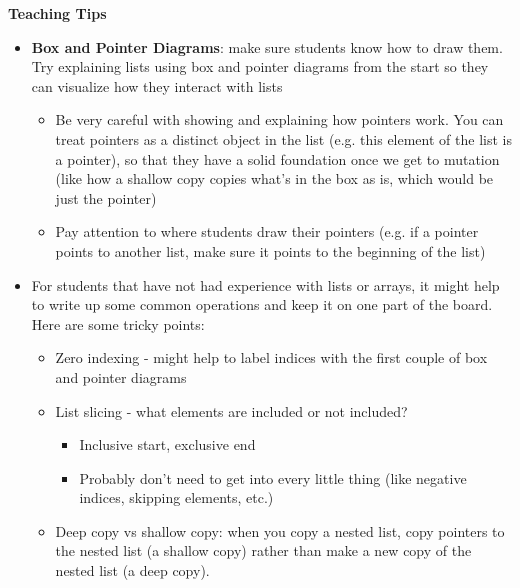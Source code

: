 \begin{blocksection}
	\begin{guide}
	\textbf{Teaching Tips}
	\begin{itemize}
			\item \textbf{Box and Pointer Diagrams}: make sure students know how to draw them. Try explaining lists using box and pointer diagrams from the start so they can visualize how they interact with lists
			\begin{itemize}
				\item Be very careful with showing and explaining how pointers work. You can treat pointers as a distinct object in the list (e.g. this element of the list is a pointer), so that they have a solid foundation once we get to mutation (like how a shallow copy copies what’s in the box as is, which would be just the pointer)
				\item Pay attention to where students draw their pointers (e.g. if a pointer points to another list, make sure it points to the beginning of the list)
			\end{itemize}
			\item For students that have not had experience with lists or arrays, it might help to write up some common operations and keep it on one part of the board. Here are some tricky points:
			\begin{itemize}
				\item Zero indexing - might help to label indices with the first couple of box and pointer diagrams
				\item List slicing - what elements are included or not included?
				\begin{itemize}
					\item Inclusive start, exclusive end
					\item Probably don’t need to get into every little thing (like negative indices, skipping elements, etc.)
				\end{itemize}
				\item Deep copy vs shallow copy: when you copy a nested list, copy pointers to the nested list (a shallow copy) rather than make a new copy of the nested list (a deep copy).
					
			\end{itemize}
	\end{itemize}
	\end{guide}
\end{blocksection}
